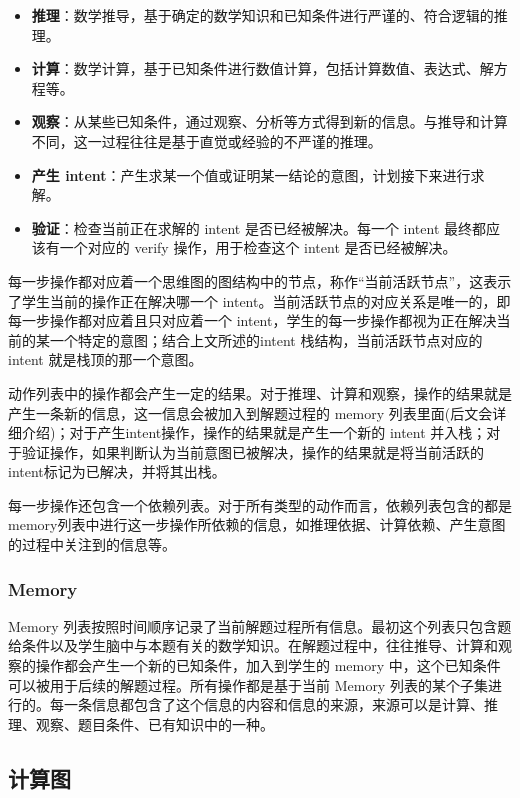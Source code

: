 \begin{itemize}
    \item \textbf{推理}：数学推导，基于确定的数学知识和已知条件进行严谨的、符合逻辑的推理。
    \item \textbf{计算}：数学计算，基于已知条件进行数值计算，包括计算数值、表达式、解方程等。
    \item \textbf{观察}：从某些已知条件，通过观察、分析等方式得到新的信息。与推导和计算不同，这一过程往往是基于直觉或经验的不严谨的推理。
    \item \textbf{产生 intent}：产生求某一个值或证明某一结论的意图，计划接下来进行求解。
    \item \textbf{验证}：检查当前正在求解的 intent 是否已经被解决。每一个 intent 最终都应该有一个对应的 verify 操作，用于检查这个 intent 是否已经被解决。
\end{itemize}

每一步操作都对应着一个思维图的图结构中的节点，称作“当前活跃节点”，这表示了学生当前的操作正在解决哪一个 intent。当前活跃节点的对应关系是唯一的，即每一步操作都对应着且只对应着一个 intent，学生的每一步操作都视为正在解决当前的某一个特定的意图；结合上文所述的intent 栈结构，当前活跃节点对应的 intent 就是栈顶的那一个意图。

动作列表中的操作都会产生一定的结果。对于推理、计算和观察，操作的结果就是产生一条新的信息，这一信息会被加入到解题过程的 memory 列表里面(后文会详细介绍)；对于产生intent操作，操作的结果就是产生一个新的 intent 并入栈；对于验证操作，如果判断认为当前意图已被解决，操作的结果就是将当前活跃的intent标记为已解决，并将其出栈。

每一步操作还包含一个依赖列表。对于所有类型的动作而言，依赖列表包含的都是memory列表中进行这一步操作所依赖的信息，如推理依据、计算依赖、产生意图的过程中关注到的信息等。

\subsubsection*{Memory}

Memory 列表按照时间顺序记录了当前解题过程所有信息。最初这个列表只包含题给条件以及学生脑中与本题有关的数学知识。在解题过程中，往往推导、计算和观察的操作都会产生一个新的已知条件，加入到学生的 memory 中，这个已知条件可以被用于后续的解题过程。所有操作都是基于当前 Memory 列表的某个子集进行的。每一条信息都包含了这个信息的内容和信息的来源，来源可以是计算、推理、观察、题目条件、已有知识中的一种。

\subsection{计算图}

